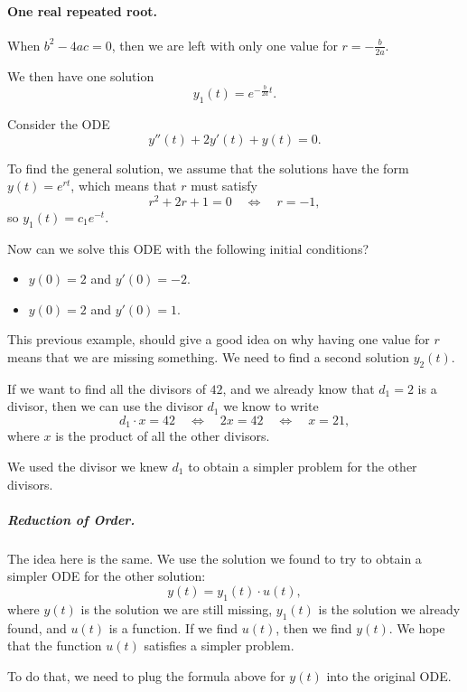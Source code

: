 \paragraph{\color{cyan}One real repeated root.} When $b^2-4ac=0$, then we are left with only one value for $r=-\frac{b}{2a}$.

We then have one solution
$$
y_1(t) = e^{-\frac{b}{2a}t}.
$$

\begin{example}
Consider the ODE 
$$
y''(t) + 2y'(t) + y(t) = 0.
$$	

To find the general solution, we assume that the solutions have the form $y(t) = e^{rt}$, which means that $r$ must satisfy
$$
r^2 +2r+1 = 0 
	\quad \Leftrightarrow \quad r=-1,
$$
so $y_1(t) = c_1 e^{-t}$.

Now can we solve this ODE with the following initial conditions?
\begin{itemize}
	\item $y(0)=2$ and $y'(0)=-2$.
	\item $y(0)=2$ and $y'(0)=1$.
\end{itemize}
\end{example}

This previous example, should give a good idea on why having one value for $r$ means that we are missing something. 
We need to find a second solution $y_2(t)$. \\


\begin{graybox}
If we want to find all the divisors of $42$, and we already know that $d_1=2$ is a divisor, then we can use the divisor $d_1$ we know to write 
$$
d_1 \cdot x = 42 
	\quad \Leftrightarrow\quad 2x = 42
	\quad \Leftrightarrow\quad x = 21,
$$
where $x$ is the product of all the other divisors.

We used the divisor we knew $d_1$ to obtain a simpler problem for the other divisors.
\end{graybox}


\subparagraph{\color{cyan}Reduction of Order.} The idea here is the same. We use the solution we found to try to obtain a simpler ODE for the other solution:
$$
y(t) = y_1(t) \cdot u(t),
$$
where $y(t)$ is the solution we are still missing, $y_1(t)$ is the solution we already found, and $u(t)$ is a function. If we find $u(t)$, then we find $y(t)$. We hope that the function $u(t)$ satisfies a simpler problem.

To do that, we need to plug the formula above for $y(t)$ into the original ODE. 

